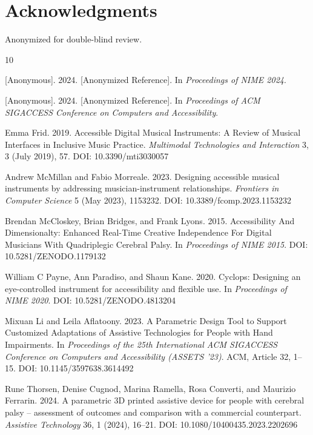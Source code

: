 \documentclass[manuscript,screen,review,anonymous]{acmart}
\begin{document}
\section{Acknowledgments}

Anonymized for double-blind review.


\begin{thebibliography}{10}


[Anonymous]. 2024.
[Anonymized Reference].
In \textit{Proceedings of NIME 2024}.

[Anonymous]. 2024.
[Anonymized Reference].
In \textit{Proceedings of ACM SIGACCESS Conference on Computers and Accessibility}.

Emma Frid. 2019.
Accessible Digital Musical Instruments: A Review of Musical Interfaces in Inclusive Music Practice.
\textit{Multimodal Technologies and Interaction} 3, 3 (July 2019), 57.
DOI: 10.3390/mti3030057

Andrew McMillan and Fabio Morreale. 2023.
Designing accessible musical instruments by addressing musician-instrument relationships.
\textit{Frontiers in Computer Science} 5 (May 2023), 1153232.
DOI: 10.3389/fcomp.2023.1153232

Brendan McCloskey, Brian Bridges, and Frank Lyons. 2015.
Accessibility And Dimensionalty: Enhanced Real-Time Creative Independence For Digital Musicians With Quadriplegic Cerebral Palsy.
In \textit{Proceedings of NIME 2015}.
DOI: 10.5281/ZENODO.1179132

William C Payne, Ann Paradiso, and Shaun Kane. 2020.
Cyclops: Designing an eye-controlled instrument for accessibility and flexible use.
In \textit{Proceedings of NIME 2020}.
DOI: 10.5281/ZENODO.4813204

Mixuan Li and Leila Aflatoony. 2023.
A Parametric Design Tool to Support Customized Adaptations of Assistive Technologies for People with Hand Impairments.
In \textit{Proceedings of the 25th International ACM SIGACCESS Conference on Computers and Accessibility (ASSETS '23)}.
ACM, Article 32, 1--15.
DOI: 10.1145/3597638.3614492

Rune Thorsen, Denise Cugnod, Marina Ramella, Rosa Converti, and Maurizio Ferrarin. 2024.
A parametric 3D printed assistive device for people with cerebral palsy -- assessment of outcomes and comparison with a commercial counterpart.
\textit{Assistive Technology} 36, 1 (2024), 16--21.
DOI: 10.1080/10400435.2023.2202696


\end{thebibliography}
\end{document}
